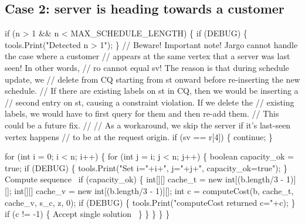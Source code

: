 \subsection{Case 2: server is heading towards a customer}
\nwenddocs{}\endmoddef\nwstartdeflinemarkup{}\nwenddeflinemarkup
if (n > 1 && n < MAX_SCHEDULE_LENGTH) \{
  if (DEBUG) \{
    tools.Print("Detected n > 1");
  \}
  // Beware! Important note! Jargo cannot handle the case where a customer
  // appears at the same vertex that a server was last seen! In other words,
  // ro cannot equal sv! The reason is that during schedule update, we
  // delete from CQ starting from st onward before re-inserting the new schedule.
  // If there are existing labels on st in CQ, then we would be inserting a
  // second entry on st, causing a constraint violation. If we delete the
  // existing labels, we would have to first query for them and then re-add them.
  // This could be a future fix.
  //
  // As a workaround, we skip the server if it's last-seen vertex happens
  // to be at the request origin.
  if (sv == r[4]) \{
    continue;
  \}

  for (int i = 0; i < n; i++) \{
    for (int j = i; j < n; j++) \{
      boolean capacity_ok = true;
      if (DEBUG) \{
        tools.Print("Set i="+i+", j="+j+", capacity_ok=true");
      \}
      \LA{}Compute sequence~{\nwtagstyle{}}\RA{}
      if (capacity_ok) \{
        int[][] cache_t = new int[(b.length/3 - 1)][];
        int[][] cache_v = new int[(b.length/3 - 1)][];
        int c = computeCost(b, cache_t, cache_v, s_c, z, 0);
        if (DEBUG) \{
          tools.Print("computeCost returned c="+c);
        \}
        if (c != -1) \{
          \LA{}Accept single solution~{\nwtagstyle{}}\RA{}
        \}
      \}
    \}
  \}
\}
\nwendcode{}\nwdocspar

